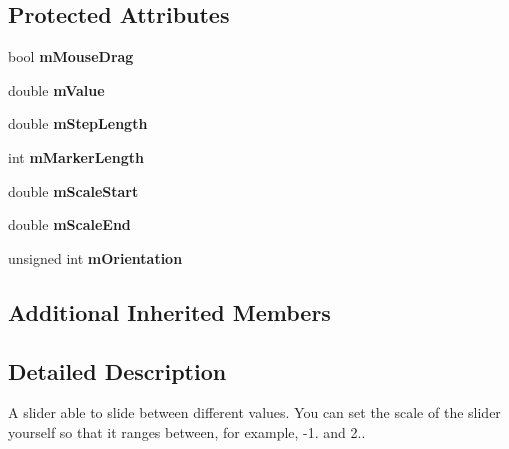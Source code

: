 \subsection*{Protected Attributes}
\begin{DoxyCompactItemize}
\item 
bool {\bfseries m\+Mouse\+Drag}\hypertarget{classgcn_1_1Slider_a01ad4b5fe389bebe1f6ed76996258d5e}{}\label{classgcn_1_1Slider_a01ad4b5fe389bebe1f6ed76996258d5e}

\item 
double {\bfseries m\+Value}\hypertarget{classgcn_1_1Slider_a8cc86a32845297a7aef706740d819023}{}\label{classgcn_1_1Slider_a8cc86a32845297a7aef706740d819023}

\item 
double {\bfseries m\+Step\+Length}\hypertarget{classgcn_1_1Slider_ac83e5c1a97f8de8bce6aa75098dbf431}{}\label{classgcn_1_1Slider_ac83e5c1a97f8de8bce6aa75098dbf431}

\item 
int {\bfseries m\+Marker\+Length}\hypertarget{classgcn_1_1Slider_adf9fd0c503c3db3453a43e3c3e7d5bf1}{}\label{classgcn_1_1Slider_adf9fd0c503c3db3453a43e3c3e7d5bf1}

\item 
double {\bfseries m\+Scale\+Start}\hypertarget{classgcn_1_1Slider_a497a7bb4c97eed4e3e37b28e9a0ec141}{}\label{classgcn_1_1Slider_a497a7bb4c97eed4e3e37b28e9a0ec141}

\item 
double {\bfseries m\+Scale\+End}\hypertarget{classgcn_1_1Slider_a5db232fff7ff43fce31e8b30d0b31bb0}{}\label{classgcn_1_1Slider_a5db232fff7ff43fce31e8b30d0b31bb0}

\item 
unsigned int {\bfseries m\+Orientation}\hypertarget{classgcn_1_1Slider_a11f797a8e5168832238b2822023c3687}{}\label{classgcn_1_1Slider_a11f797a8e5168832238b2822023c3687}

\end{DoxyCompactItemize}
\subsection*{Additional Inherited Members}


\subsection{Detailed Description}
A slider able to slide between different values. You can set the scale of the slider yourself so that it ranges between, for example, -\/1. and 2.. 

